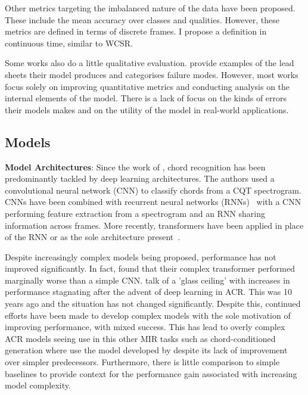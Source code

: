 Other metrics targeting the imbalanced nature of the data have been proposed. These include the mean accuracy over classes and qualities. However, these metrics are defined in terms of discrete frames. I propose a definition in continuous time, similar to WCSR.

Some works also do a little qualitative evaluation. \citet{MelodyTranscriptionViaGenerativePreTraining} provide examples of the lead sheets their model produces and categorises failure modes. However, most works focus solely on improving quantitative metrics and conducting analysis on the internal elements of the model. There is a lack of focus on the kinds of errors their models makes and on the utility of the model in real-world applications.

\subsection{Models}

\textbf{Model Architectures}: Since the work of \citet{RethinkingChordRecognition}, chord recognition has been predominantly tackled by deep learning architectures. The authors used a convolutional neural network (CNN) to classify chords from a CQT spectrogram. CNNs have been combined with recurrent neural networks (RNNs)~\citep{ACRCNNRNN1,ACRLargeVocab1,StructuredTraining} with a CNN performing feature extraction from a spectrogram and an RNN sharing information across frames. More recently, transformers have been applied in place of the RNN or as the sole architecture present~\citep{MelodyTranscriptionViaGenerativePreTraining, HarmonyTransformer, AttendToChords,ChordFormer,CurriculumLearning,BTC}.

Despite increasingly complex models being proposed, performance has not improved significantly. In fact, \citet{BTC} found that their complex transformer performed marginally worse than a simple CNN. \citet{FourTimelyInsights} talk of a 'glass ceiling' with increases in performance stagnating after the advent of deep learning in ACR. This was 10 years ago and the situation has not changed significantly. Despite this, continued efforts have been made to develop complex models with the sole motivation of improving performance, with mixed success. This has lead to overly complex ACR models seeing use in this other MIR tasks such as chord-conditioned generation where \citet{MusiConGen} use the model developed by \citet{BTC} despite its lack of improvement over simpler predecessors. Furthermore, there is little comparison to simple baselines to provide context for the performance gain associated with increasing model complexity.

